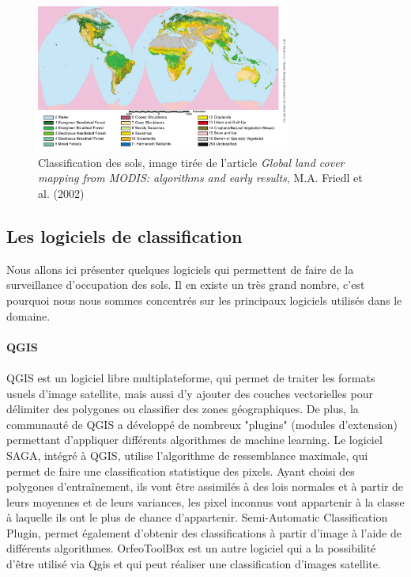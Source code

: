 \documentclass[a4paper,10pt]{report}
\begin{document}
\begin{figure}[H]
  \centering
    \includegraphics[width=0.75\textwidth]{classifSols.png}
  \caption{Classification des sols, image tirée de l'article \textit{Global land cover mapping from MODIS: algorithms and early results}, M.A. Friedl et al. (2002)}
  \label{fig:clSols}
\end{figure}

\subsection{Les logiciels de classification}
Nous allons ici présenter quelques logiciels qui permettent de faire de la surveillance d'occupation des sols. Il en existe un très grand nombre, c'est pourquoi nous nous sommes concentrés sur les principaux logiciels utilisés dans le domaine.
\paragraph{QGIS}
\paragraph{}
QGIS est un logiciel libre multiplateforme, qui permet de traiter les formats usuels d'image satellite, mais aussi d'y ajouter des couches vectorielles pour délimiter des polygones ou classifier des zones géographiques.
De plus, la communauté de QGIS a développé de nombreux "plugins" (modules d'extension) permettant d'appliquer différents algorithmes de machine learning.\newline
Le logiciel SAGA, intégré à QGIS, utilise l'algorithme de ressemblance maximale, qui permet de faire une classification statistique des pixels. Ayant choisi des polygones d'entraînement, ils vont être assimilés à des lois normales et à partir de leurs moyennes et de leurs variances, les pixel inconnus vont appartenir à la classe à laquelle ils ont le plus de chance d'appartenir.
Semi-Automatic Classification Plugin, permet également d'obtenir des classifications à partir d'image à l'aide de différents algorithmes.
OrfeoToolBox est un autre logiciel qui a la possibilité d'être utilisé via Qgis et qui peut réaliser une classification d'images satellite.
\end{document}
